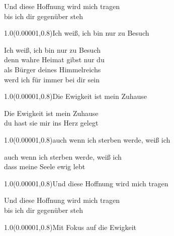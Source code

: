 \documentclass[aspectratio=169]{beamer}
\begin{document}
\begin{frame}
\centering
\color{white}
\huge{Und diese Hoffnung wird mich tragen} \\
\huge{bis ich dir gegenüber steh} \\

\begin{textblock}{1.0}(0.00001,0.8)\color{gray}\normalsize{Ich weiß, ich bin nur zu Besuch}\end{textblock}
\end{frame}

\begin{frame}
\centering
\color{white}
\huge{Ich weiß, ich bin nur zu Besuch} \\
\huge{denn wahre Heimat gibst nur du} \\
\huge{als Bürger deines Himmelreichs} \\
\huge{werd ich für immer bei dir sein} \\

\begin{textblock}{1.0}(0.00001,0.8)\color{gray}\normalsize{Die Ewigkeit ist mein Zuhause}\end{textblock}
\end{frame}

\begin{frame}
\centering
\color{white}
\huge{Die Ewigkeit ist mein Zuhause} \\
\huge{du hast sie mir ins Herz gelegt} \\

\begin{textblock}{1.0}(0.00001,0.8)\color{gray}\normalsize{auch wenn ich sterben werde, weiß ich}\end{textblock}
\end{frame}

\begin{frame}
\centering
\color{white}
\huge{auch wenn ich sterben werde, weiß ich} \\
\huge{dass meine Seele ewig lebt} \\

\begin{textblock}{1.0}(0.00001,0.8)\color{gray}\normalsize{Und diese Hoffnung wird mich tragen}\end{textblock}
\end{frame}

\begin{frame}
\centering
\color{white}
\huge{Und diese Hoffnung wird mich tragen} \\
\huge{bis ich dir gegenüber steh} \\

\begin{textblock}{1.0}(0.00001,0.8)\color{gray}\normalsize{Mit Fokus auf die Ewigkeit}\end{textblock}
\end{frame}
\end{document}
